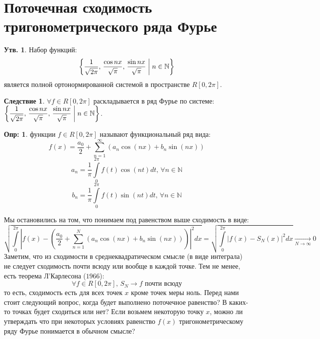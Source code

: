 \documentclass[12pt]{article}
\newcommand{\RN}[1]{%
	\textup{\uppercase\expandafter{\romannumeral#1}}%
}
\newcommand{\MN}{\mathbb{N}}
\theoremstyle{definition}
\newtheorem{defn}{Опр:}
\newtheorem{prop}{Утв.}
\newtheorem{corollary}{Следствие}
\newcommand{\ddsum}[2]{\displaystyle\sum\limits_{#1}^{#2}}
\newcommand{\ddint}[2]{\displaystyle\int\limits_{#1}^{#2}}
\begin{document}
\lhead{Математический анализ - \RN{3}}
\section*{Поточечная сходимость тригонометрического ряда Фурье}

\begin{prop}
	Набор функций: 
	$$
		\left\{\dfrac{1}{\sqrt{2\pi}}, \, \dfrac{\cos{nx}}{\sqrt{\pi}}, \, \dfrac{\sin{nx}}{\sqrt{\pi}}  \biggm\vert  n \in \MN  \right\}
	$$ 
	является полной ортонормированной системой в пространстве $R[0,2\pi]$.
\end{prop}

\begin{corollary}
	$\forall f \in R[0,2\pi]$ раскладывается в ряд Фурье по системе: $
	\left\{\dfrac{1}{\sqrt{2\pi}}, \, \dfrac{\cos{nx}}{\sqrt{\pi}}, \, \dfrac{\sin{nx}}{\sqrt{\pi}}  \biggm\vert  n \in \MN  \right\}
	$.
\end{corollary}

\begin{defn}
	 функции $f \in R[0,2\pi]$ называют функциональный ряд вида:
	$$
		f(x) = \dfrac{a_0}{2} + \ddsum{n = 1}{\infty}\left(a_n \cos{(nx)} + b_n \sin{(nx)}\right)
	$$
	$$
		a_n = \dfrac{1}{\pi}\ddint{0}{2\pi}f(t)\cos{(nt)}dt, \, \forall n \in \MN
	$$
	$$	
		b_n = \dfrac{1}{\pi}\ddint{0}{2\pi}f(t)\sin{(nt)}dt, \, \forall n \in \MN
	$$
\end{defn}

Мы остановились на том, что понимаем под равенством выше сходимость в виде:
$$
	\sqrt{\ddint{0}{2\pi} \left|f(x) -   \left(\dfrac{a_0}{2} + \ddsum{n = 1}{N}\left(a_n \cos{(nx)} + b_n \sin{(nx)}\right)\right) \right|^2 dx} = \sqrt{\ddint{0}{2\pi}\left| f(x) - S_N(x) \right|^2dx} \xrightarrow[N \to \infty]{} 0
$$
Заметим, что из сходимости в среднеквадратическом смысле (в виде интеграла) не следует сходимость почти всюду или вообще в каждой точке. Тем не менее, есть теорема Л'Карлесона ($1966$): 
$$
	\forall f \in R[0,2\pi], \, S_N \to f \text{ почти всюду}
$$
то есть, сходимость есть для всех точек $x$ кроме точек меры ноль. Перед нами стоит следующий вопрос, когда будет выполнено поточечное равенство? В каких-то точках будет сходиться или нет? Если возьмем некоторую точку $x$, можно ли утверждать что при некоторых условиях равенство $f(x)$ тригонометрическому ряду Фурье понимается в обычном смысле?
\end{document}
